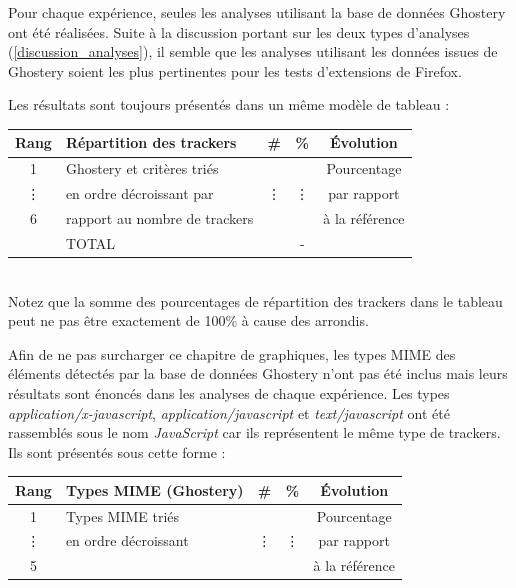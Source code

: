 Pour chaque expérience, seules les analyses utilisant la base de données Ghostery ont été réalisées. Suite à la discussion portant sur les deux types d'analyses (\autoref{discussion_analyses}), il semble que les analyses utilisant les données issues de Ghostery soient les plus pertinentes pour les tests d'extensions de Firefox.
\newline

Les résultats sont toujours présentés dans un même modèle de tableau :\\

\begin{tabular}{ c | p{6cm} | c | c || c | }
   Rang & Répartition des trackers & \# & \% & Évolution \\
   \hline
   \hline
   1 & Ghostery et critères triés &  &  & Pourcentage \\
   \vdots & en ordre décroissant par & \vdots & \vdots & par rapport \\
   6 & rapport au nombre de trackers &  &  & à la référence \\
   \hline
    & TOTAL &  & - & \\
   \hline
\end{tabular}
\\[1cm]
Notez que la somme des pourcentages de répartition des trackers dans le tableau peut ne pas être exactement de 100\% à cause des arrondis.
\newline

Afin de ne pas surcharger ce chapitre de graphiques, les types MIME des éléments détectés par la base de données Ghostery n'ont pas été inclus mais leurs résultats sont énoncés dans les analyses de chaque expérience. Les types \textit{application/x-javascript}, \textit{application/javascript} et \textit{text/javascript} ont été rassemblés sous le nom \textit{JavaScript} car ils représentent le même type de trackers. Ils sont présentés sous cette forme :\\

\begin{tabular}{ c | p{5cm} | c | c | c | }
   Rang & Types MIME (Ghostery) & \# & \% & Évolution\\
   \hline
   \hline
   1 & Types MIME triés &  &  & Pourcentage \\
   \vdots & en ordre décroissant & \vdots & \vdots & par rapport \\
   5 &  &  &  & à la référence \\
   \hline
\end{tabular}
\\[1cm]

